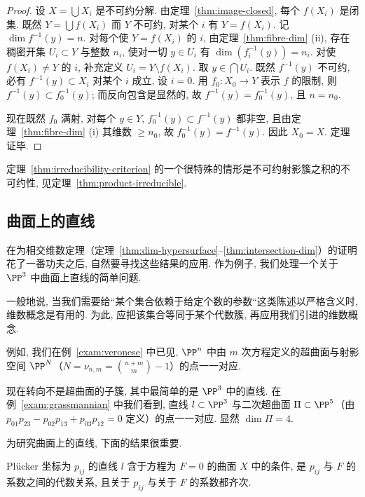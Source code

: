 \begin{proof}
	设 $X = \bigcup X_i$ 是不可约分解. 由定理~\ref{thm:image-closed}, 每个 $f(X_i)$ 是闭集. 既然 $Y = \bigcup f(X_i)$ 而 $Y$ 不可约, 对某个 $i$ 有 $Y = f(X_i)$. 记 $\dim f^{-1}(y) = n$. 对每个使 $Y = f(X_i)$ 的 $i$, 由定理~\ref{thm:fibre-dim} (ii), 存在稠密开集 $U_i \subset Y$ 与整数 $n_i$, 使对一切 $y \in U_i$ 有 $\dim(f_i^{-1}(y)) = n_i$. 对使 $f(X_i) \ne Y$ 的 $i$, 补充定义 $U_i = Y \setminus f(X_i)$. 取 $y \in \bigcap U_i$. 既然 $f^{-1}(y)$ 不可约, 必有 $f^{-1}(y) \subset X_i$ 对某个 $i$ 成立, 设 $i = 0$. 用 $f_0: X_0 \to Y$ 表示 $f$ 的限制, 则 $f^{-1}(y) \subset f_0^{-1}(y)$; 而反向包含是显然的, 故 $f^{-1}(y) = f_0^{-1}(y)$, 且 $n = n_0$.

	现在既然 $f_0$ 满射, 对每个 $y \in Y$, $f_0^{-1}(y) \subset f^{-1}(y)$ 都非空, 且由定理~\ref{thm:fibre-dim} (i) 其维数 $\ge n_0$, 故 $f_0^{-1}(y) = f^{-1}(y)$. 因此 $X_0 = X$. 定理证毕.
\end{proof}

定理~\ref{thm:irreducibility-criterion} 的一个很特殊的情形是不可约射影簇之积的不可约性, 见定理~\ref{thm:product-irreducible}.

\subsection{曲面上的直线}

在为相交维数定理（定理~\ref{thm:dim-hypersurface}--\ref{thm:intersection-dim}）的证明花了一番功夫之后, 自然要寻找这些结果的应用. 作为例子, 我们处理一个关于 $\PP^3$ 中曲面上直线的简单问题.

一般地说, 当我们需要给``某个集合依赖于给定个数的参数``这类陈述以严格含义时, 维数概念是有用的. 为此, 应把该集合等同于某个代数簇, 再应用我们引进的维数概念.

例如, 我们在例~\ref{exam:veronese} 中已见, $\PP^n$ 中由 $m$ 次方程定义的超曲面与射影空间 $\PP^N$（$N = \nu_{n,m} = \binom{n+m}{m} - 1$）的点一一对应.

现在转向不是超曲面的子簇, 其中最简单的是 $\PP^3$ 中的直线. 在例~\ref{exam:grassmannian} 中我们看到, 直线 $l \subset \PP^3$ 与二次超曲面 $\Pi \subset \PP^5$（由 $p_{01} p_{23} - p_{02} p_{13} + p_{03} p_{12} = 0$ 定义）的点一一对应. 显然 $\dim \Pi = 4$.

为研究曲面上的直线, 下面的结果很重要.

\begin{lemma}\label{lem:line-on-surface}
	Plücker 坐标为 $p_{ij}$ 的直线 $l$ 含于方程为 $F = 0$ 的曲面 $X$ 中的条件, 是 $p_{ij}$ 与 $F$ 的系数之间的代数关系, 且关于 $p_{ij}$ 与关于 $F$ 的系数都齐次.
\end{lemma}

